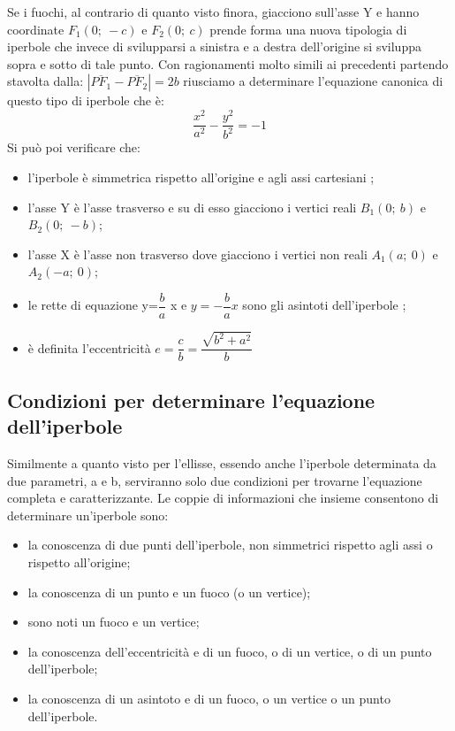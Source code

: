 Se i fuochi, al contrario di quanto visto finora, giacciono sull'asse Y e 
hanno coordinate $ F_{1} (0;~-c)$ e $ F_{2} (0;~c)$ prende forma una nuova 
tipologia di iperbole che invece di svilupparsi a sinistra e a destra 
dell'origine si sviluppa sopra e sotto di tale punto.
Con ragionamenti molto simili ai precedenti partendo stavolta dalla: 
$\left|\overline{PF_{1}}-\overline{PF_{2}}\right|=2b$ riusciamo a 
determinare l'equazione canonica di questo tipo di iperbole che è: 
\begin{equation}
\dfrac{x^{2}}{a^{2}}-\dfrac{y^{2}}{b^{2}}=-1
\end{equation}
Si può poi verificare che:
\begin{itemize} [noitemsep]
  \item l'iperbole è simmetrica rispetto all'origine e agli assi 
cartesiani ;
  \item l'asse Y è l'asse trasverso e su di esso giacciono i vertici 
reali $ B_{1} (0;~b)$ e $ B_{2} (0;~-b)$;
  \item l'asse X è l'asse non trasverso dove giacciono i vertici non 
reali $ A_{1} (a;~0)$ e $ A_{2} (-a;~0)$;
  \item le rette di equazione y=$ \dfrac{b}{a} $ x  e   
$y=-\dfrac{b}{a} x$ sono gli asintoti dell'iperbole ;
  \item è definita l'eccentricità 
$e=\dfrac{c}{b}=\dfrac{\sqrt{b^{2}+a^{2}}}{b} $
\end{itemize}

\subsection{Condizioni per determinare l'equazione dell'iperbole}

Similmente a quanto visto per l'ellisse, essendo anche l'iperbole 
determinata da due parametri, a e b, serviranno solo due condizioni per 
trovarne l'equazione completa e caratterizzante.
Le coppie di informazioni che insieme consentono di determinare un'iperbole 
sono:
\begin{itemize} [noitemsep]
\item la conoscenza di due punti dell'iperbole, non simmetrici rispetto 
agli assi o rispetto all'origine;
\item la conoscenza di un punto e un fuoco (o un vertice);
\item sono noti un fuoco e un vertice;
\item la conoscenza dell'eccentricità e di un fuoco, o di un vertice, o di 
un punto dell'iperbole;
\item la conoscenza di un asintoto e di un fuoco, o un vertice o un punto 
dell'iperbole.
\end{itemize}


